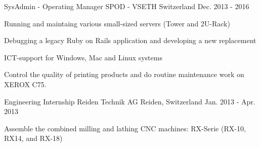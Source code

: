

\begin{cventries}

  \cventry
    {SysAdmin - Operating Manager} %
    {SPOD - VSETH} %
    {Switzerland} %
    {Dec. 2013 - 2016} %
    {
      \begin{cvitems} %
        \item {Running and maintaing various small-sized servers (Tower and 2U-Rack)}
        \item {Debugging a legacy Ruby on Rails application and developing a new replacement}
        \item {ICT-support for Windows, Mac and Linux systems}
        \item {Control the quality of printing products and do routine maintenance work on XEROX C75. }
      \end{cvitems}
    }

  \cventry
    {Engineering Internship} %
    {Reiden Technik AG} %
    {Reiden, Switzerland} %
    {Jan. 2013 - Apr. 2013} %
    {
      \begin{cvitems} %
        \item {Assemble the combined milling and lathing CNC machines: RX-Serie (RX-10, RX14, and RX-18)}
      \end{cvitems}
    }


\end{cventries}
